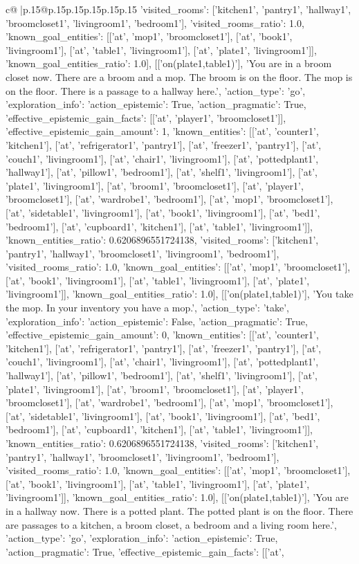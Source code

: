 \documentclass{article}
\begin{document}
{\begin{supertabular}{c@{$\;$}|p{.15\linewidth}@{}p{.15\linewidth}p{.15\linewidth}p{.15\linewidth}p{.15\linewidth}p{.15\linewidth}}
{{{'visited_rooms': ['kitchen1', 'pantry1', 'hallway1', 'broomcloset1', 'livingroom1', 'bedroom1'], 'visited_rooms_ratio': 1.0, 'known_goal_entities': [['at', 'mop1', 'broomcloset1'], ['at', 'book1', 'livingroom1'], ['at', 'table1', 'livingroom1'], ['at', 'plate1', 'livingroom1']], 'known_goal_entities_ratio': 1.0}}], [['on(plate1,table1)'], 'You are in a broom closet now. There are a broom and a mop. The broom is on the floor. The mop is on the floor. There is a passage to a hallway here.', {'action_type': 'go', 'exploration_info': {'action_epistemic': True, 'action_pragmatic': True, 'effective_epistemic_gain_facts': [['at', 'player1', 'broomcloset1']], 'effective_epistemic_gain_amount': 1, 'known_entities': [['at', 'counter1', 'kitchen1'], ['at', 'refrigerator1', 'pantry1'], ['at', 'freezer1', 'pantry1'], ['at', 'couch1', 'livingroom1'], ['at', 'chair1', 'livingroom1'], ['at', 'pottedplant1', 'hallway1'], ['at', 'pillow1', 'bedroom1'], ['at', 'shelf1', 'livingroom1'], ['at', 'plate1', 'livingroom1'], ['at', 'broom1', 'broomcloset1'], ['at', 'player1', 'broomcloset1'], ['at', 'wardrobe1', 'bedroom1'], ['at', 'mop1', 'broomcloset1'], ['at', 'sidetable1', 'livingroom1'], ['at', 'book1', 'livingroom1'], ['at', 'bed1', 'bedroom1'], ['at', 'cupboard1', 'kitchen1'], ['at', 'table1', 'livingroom1']], 'known_entities_ratio': 0.6206896551724138, 'visited_rooms': ['kitchen1', 'pantry1', 'hallway1', 'broomcloset1', 'livingroom1', 'bedroom1'], 'visited_rooms_ratio': 1.0, 'known_goal_entities': [['at', 'mop1', 'broomcloset1'], ['at', 'book1', 'livingroom1'], ['at', 'table1', 'livingroom1'], ['at', 'plate1', 'livingroom1']], 'known_goal_entities_ratio': 1.0}}], [['on(plate1,table1)'], 'You take the mop. In your inventory you have a mop.', {'action_type': 'take', 'exploration_info': {'action_epistemic': False, 'action_pragmatic': True, 'effective_epistemic_gain_amount': 0, 'known_entities': [['at', 'counter1', 'kitchen1'], ['at', 'refrigerator1', 'pantry1'], ['at', 'freezer1', 'pantry1'], ['at', 'couch1', 'livingroom1'], ['at', 'chair1', 'livingroom1'], ['at', 'pottedplant1', 'hallway1'], ['at', 'pillow1', 'bedroom1'], ['at', 'shelf1', 'livingroom1'], ['at', 'plate1', 'livingroom1'], ['at', 'broom1', 'broomcloset1'], ['at', 'player1', 'broomcloset1'], ['at', 'wardrobe1', 'bedroom1'], ['at', 'mop1', 'broomcloset1'], ['at', 'sidetable1', 'livingroom1'], ['at', 'book1', 'livingroom1'], ['at', 'bed1', 'bedroom1'], ['at', 'cupboard1', 'kitchen1'], ['at', 'table1', 'livingroom1']], 'known_entities_ratio': 0.6206896551724138, 'visited_rooms': ['kitchen1', 'pantry1', 'hallway1', 'broomcloset1', 'livingroom1', 'bedroom1'], 'visited_rooms_ratio': 1.0, 'known_goal_entities': [['at', 'mop1', 'broomcloset1'], ['at', 'book1', 'livingroom1'], ['at', 'table1', 'livingroom1'], ['at', 'plate1', 'livingroom1']], 'known_goal_entities_ratio': 1.0}}], [['on(plate1,table1)'], 'You are in a hallway now. There is a potted plant. The potted plant is on the floor. There are passages to a kitchen, a broom closet, a bedroom and a living room here.', {'action_type': 'go', 'exploration_info': {'action_epistemic': True, 'action_pragmatic': True, 'effective_epistemic_gain_facts': [['at', }}}
\end{supertabular}}
\end{document}
